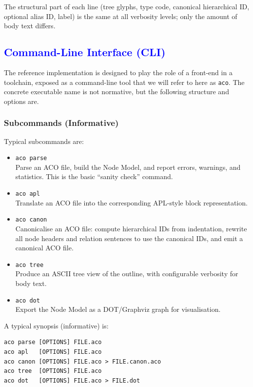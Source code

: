 \documentclass[11pt]{article}
\begin{document}
The structural part of each line (tree glyphs, type code, canonical hierarchical ID, optional alias ID, label) is the same at all verbosity levels; only the amount of body text differs.
\endgroup

\subsection*{\textcolor{blue}{Command-Line Interface (CLI)}}

\begingroup
\color{blue}
The reference implementation is designed to play the role of a front-end in a toolchain, exposed as a command-line tool that we will refer to here as \texttt{aco}. The concrete executable name is not normative, but the following structure and options are.

\subsubsection*{Subcommands (Informative)}

Typical subcommands are:

\begin{itemize}[leftmargin=2em]
  \item \texttt{aco parse} \\
        Parse an ACO file, build the Node Model, and report errors, warnings, and statistics. This is the basic ``sanity check'' command.
  \item \texttt{aco apl} \\
        Translate an ACO file into the corresponding APL-style block representation.
  \item \texttt{aco canon} \\
        Canonicalise an ACO file: compute hierarchical IDs from indentation, rewrite all node headers and relation sentences to use the canonical IDs, and emit a canonical ACO file.
  \item \texttt{aco tree} \\
        Produce an ASCII tree view of the outline, with configurable verbosity for body text.
  \item \texttt{aco dot} \\
        Export the Node Model as a DOT/Graphviz graph for visualisation.
\end{itemize}

A typical synopsis (informative) is:

\begin{verbatim}
aco parse [OPTIONS] FILE.aco
aco apl   [OPTIONS] FILE.aco
aco canon [OPTIONS] FILE.aco > FILE.canon.aco
aco tree  [OPTIONS] FILE.aco
aco dot   [OPTIONS] FILE.aco > FILE.dot
\end{verbatim}
\end{document}
